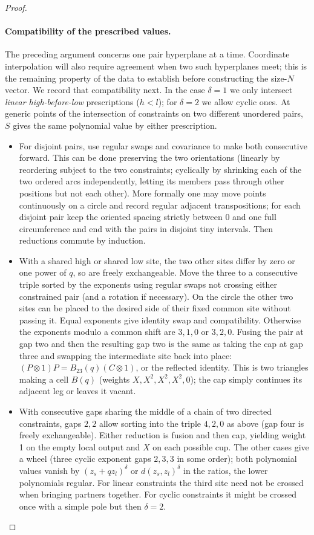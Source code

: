 \documentclass[11pt]{article}
\numberwithin{equation}{section}
\theoremstyle{definition}\newtheorem{definition}[theorem]{Definition}
\theoremstyle{remark}\newtheorem{remark}[theorem]{Remark}
\begin{document}
\begin{proof}
\paragraph{Compatibility of the prescribed values.}
The preceding argument concerns one pair hyperplane at a time. Coordinate
interpolation will also require agreement when two such hyperplanes meet;
this is the remaining property of the data to establish before constructing
the size-$N$ vector. We record that compatibility next. In the case \(\delta=1\) we only intersect \emph{linear high-before-low} prescriptions (\(h<l\)); for \(\delta=2\) we allow cyclic ones. At generic points of the intersection of constraints on two different unordered pairs, \(S\) gives the same polynomial value by either prescription.
\begin{itemize}
\item For disjoint pairs, use regular swaps and covariance to make both consecutive forward. This can be done preserving the two orientations (linearly by reordering subject to the two constraints; cyclically by shrinking each of the two ordered arcs independently, letting its members pass through other positions but not each other). More formally one may move points continuously on a circle and record regular adjacent transpositions; for each disjoint pair keep the oriented spacing strictly between 0 and one full circumference and end with the pairs in disjoint tiny intervals. Then reductions commute by induction.
\item With a shared high or shared low site, the two other sites differ by zero or one power of \(q\), so are freely exchangeable. Move the three to a consecutive triple sorted by the exponents using regular swaps not crossing either constrained pair (and a rotation if necessary). On the circle the other two sites can be placed to the desired side of their fixed common site without passing it. Equal exponents give identity swap and compatibility. Otherwise the exponents modulo a common shift are \(3,1,0\) or \(3,2,0\). Fusing the pair at gap two and then the resulting gap two is the same as taking the cap at gap three and swapping the intermediate site back into place: \((P\otimes1)P=B_{23}(q)(C\otimes1)\), or the reflected identity. This is two triangles making a cell \(B(q)\) (weights \(X,X^2,X^2,X^2,0\)); the cap simply continues its adjacent leg or leaves it vacant.
\item With consecutive gaps sharing the middle of a chain of two directed constraints, gaps \(2,2\) allow sorting into the triple \(4,2,0\) as above (gap four is freely exchangeable). Either reduction is fusion and then cap, yielding weight 1 on the empty local output and \(X\) on each possible cup. The other cases give a wheel (three cyclic exponent gaps \(2,3,3\) in some order); both polynomial values vanish by \((z_s+qz_l)^\delta\) or \(d(z_s,z_l)^\delta\) in the ratios, the lower polynomials regular. For linear constraints the third site need not be crossed when bringing partners together. For cyclic constraints it might be crossed once with a simple pole but then \(\delta=2\).

\end{itemize}
\end{proof}
\end{document}
